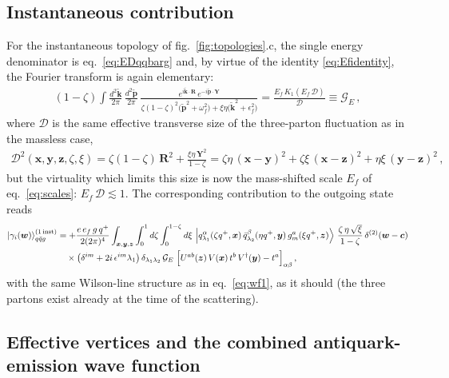 \documentclass[11pt,a4paper]{article}
\newcommand{\ket}[1]{\left|#1\right\rangle}
\newcommand{\calG}{\mathcal{G}}
\newcommand{\calD}{\mathcal{D}}
\newcommand{\vx}{\bm{x}}
\newcommand{\vy}{\bm{y}}
\newcommand{\vz}{\bm{z}}
\newcommand{\vw}{\bm{w}}
\newcommand{\vc}{\bm{c}}
\newcommand{\vR}{\bm{R}}
\newcommand{\vY}{\bm{Y}}
\newcommand{\kt}{\widetilde{\bm{k}}}
\newcommand{\pt}{\widetilde{\bm{p}}}
\newcommand{\eps}{\epsilon}
\numberwithin{equation}{section}
\begin{document}
\subsection{Instantaneous contribution}
\label{sec:inst}

For the instantaneous topology of fig.~\ref{fig:topologies}.c, the single energy denominator
is eq.~\eqref{eq:EDqqbarg} and, by virtue of the identity \eqref{eq:Efidentity}, the Fourier
transform is again elementary:
\begin{align}
\label{eq:GE}
(1-\zeta) \int \frac{d^{2}\kt}{2\pi}\, \frac{d^{2}\pt}{2\pi}\,
\frac{e^{i\kt\cdot \vR}\, e^{-i\pt\cdot \vY}}
{\zeta(1-\zeta)^{2}\big(\pt^{2}+\omega^{2}_{f}\big) + \xi\eta\big(\kt^{2}+\eps^{2}_{f}\big)}
= \frac{E_{f}\,K_{1}(E_{f}\,\calD)}{\calD} \equiv \calG_{E}\,,
\end{align}
where $\calD$ is the same effective transverse size of the three-parton fluctuation as in the
massless case,
\begin{align}
\label{eq:Ddef}
\calD^{2}(\vx,\vy,\vz,\zeta,\xi) = \zeta(1-\zeta)\,\vR^{2} + \frac{\xi\eta\,\vY^{2}}{1-\zeta}
= \zeta\eta\,(\vx-\vy)^{2} + \zeta\xi\,(\vx-\vz)^{2} + \eta\xi\,(\vy-\vz)^{2}\,,
\end{align}
but the virtuality which limits this size is now the mass-shifted scale $E_f$ of
eq.~\eqref{eq:scales}: $E_f\,\calD\lesssim 1$. The corresponding contribution to the outgoing
state reads
\begin{align}
\label{eq:wfinst}
\ket{\gamma_i(\vw)}^{(1\,\text{inst})}_{q\bar{q}g} &= +\frac{e\,e_{f}\,g\,q^{+}}{2(2\pi)^{4}}
\int_{\vx,\vy,\vz} \int_{0}^{1} d\zeta \int_{0}^{1-\zeta} d\xi\,
\ket{q^{\alpha}_{\lambda_{1}}(\zeta q^{+},\vx)\,\bar{q}^{\beta}_{\lambda_{2}}(\eta q^{+},\vy)\,
g^{a}_{m}(\xi q^{+},\vz)}\,\frac{\zeta\,\eta\,\sqrt{\xi}}{1-\zeta}\,\delta^{(2)}(\vw-\vc) \notag\\
&\quad\times \big(\delta^{im}+2i\,\epsilon^{im}\lambda_{1}\big)\,\delta_{\lambda_{1}\lambda_{2}}\,
\calG_E\;\Big[U^{ab}(\vz)\,V(\vx)\,t^{b}\,V^{\dagger}(\vy)-t^{a}\Big]_{\alpha\beta}\,,
\end{align}
with the same Wilson-line structure as in eq.~\eqref{eq:wf1}, as it should (the three partons
exist already at the time of the scattering).

\subsection{Effective vertices and the combined antiquark-emission wave function}
\label{sec:effective}
\end{document}
